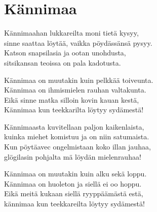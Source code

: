\section{Kännimaa}
Kännimaahan lukkareilta moni tietä kysyy,\\
sinne saattaa löytää, vaikka pöydässänsä pysyy.\\
Katson snapsilasia ja ootan unohdusta,\\
sitsikansan teoissa on pala kadotusta.

Kännimaa on muutakin kuin pelkkää toiveunta.\\
Kännimaa on ihmismielen rauhan valtakunta.\\
Eikä sinne matka silloin kovin kauan kestä,\\
Kännimaa kun teekkarilta löytyy sydämestä!

Kännimaasta kuvitellaan paljon kaikenlaista,\\
kuinka miehet komistuu ja on niin satumaista.\\
Kun pöytäavec ongelmistaan koko illan jauhaa,\\
glögilasin pohjalta mä löydän mielenrauhaa!

Kännimaa on muutakin kuin alku sekä loppu.\\
Kännimaa on huoleton ja siellä ei oo hoppu.\\
Eikä meitä kukaan siellä ryyppäämästä estä,\\
kännimaa kun teekkareilta löytyy sydämestä!